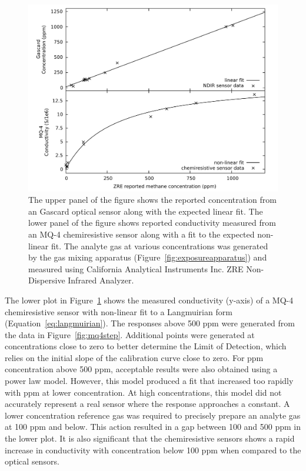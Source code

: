\documentclass[sensors,article,submit,moreauthors,pdftex]{Definitions/mdpi}
\begin{document}
			\begin{figure}[!t]
				\centering
				\includegraphics[width=0.9\columnwidth]{honey9.pdf}
				\caption{%
					The upper panel of the figure shows the reported concentration from an Gascard optical  sensor along with the expected linear fit.
					The lower panel of the figure shows reported conductivity measured from an MQ-4 chemiresistive   sensor along with a fit to the expected non-linear fit.
					The analyte gas at various concentrations was generated by the gas mixing apparatus (Figure~\ref{fig:exposureapparatus}) and measured using  California Analytical Instruments Inc. ZRE Non-Dispersive Infrared Analyzer.
				}
				\label{fig:gascardcodiff}
			\end{figure}
			
			The lower plot in Figure~\ref{fig:gascardcodiff} shows the measured conductivity (y-axis) of a MQ-4 chemiresistive  sensor with non-linear fit to a Langmuirian form (Equation~\ref{eq:langmuirian}).
			The responses above 500 ppm were generated from the data in Figure~\ref{fig:mq4step}.
			Additional points were generated at concentrations close to zero to better determine the Limit of Detection, which relies on the initial slope of the calibration curve close to zero.
			For ppm concentration above 500 ppm, acceptable results were also obtained using a power law model.  
			However, this model produced a fit that increased too rapidly with ppm at lower concentration.
			At high concentrations, this model did not accurately represent a real sensor where the response approaches a constant.
			A lower concentration reference gas was required to precisely prepare an analyte gas at 100 ppm and below.
			This action resulted in a gap between 100 and 500 ppm in the lower plot.
			It is also significant that the chemiresistive sensors shows a rapid increase in conductivity with concentration below 100 ppm when compared to the optical sensors.
			
\end{document}
